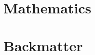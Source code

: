 
\frontmatter
\maketitle

\tableofcontents

\mainmatter
\vfill\eject




\part{Mathematics}



\backmatter
\part*{Backmatter}

\nocite{*}




